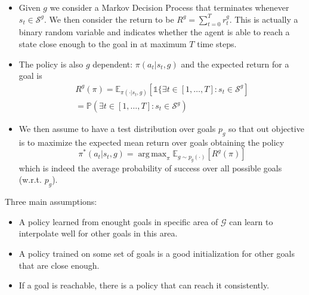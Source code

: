 \documentclass{beamer}
\theoremstyle{plain}
\theoremstyle{definition}
\theoremstyle{remark}
\newcommand{\Pro}{\mathds{P}}
\newcommand{\E}{\mathds{E}}
\DeclareMathOperator*{\argmax}{arg\,max}
\begin{document}
\begin{frame}
	\begin{itemize}
		\item Given $g$ we consider a Markov Decision Process that terminates whenever $s_t\in \mathcal{S}^g$. We then consider the return to be $R^g = \sum_{t=0}^{T}{r_t^g}$. This is actually a binary random variable and indicates whether the agent is able to reach a state close enough to the goal in at maximum $T$ time steps.
		\item The policy is also $g$ dependent: $\pi(a_t|s_t,g)$ and the expected return for a goal is
			\begin{align*}
				R^g(\pi) = \E_{\pi(\cdot|s_t,g)}\left[\mathds{1}\{\exists t\in[1,\ldots, T]: s_t\in\mathcal{S}^g\right]\\
				= \Pro\left(\exists t\in[1,\ldots, T]: s_t\in\mathcal{S}^g\right)
			\end{align*}
		\item We then assume to have a test distribution over goals $p_g$ so that out objective is to maximize the expected mean return over goals obtaining the policy
			\begin{equation*}
				\pi^{*}(a_t|s_t,g) = \argmax_{\pi}\E_{g\sim p_g(\cdot)}[R^g(\pi)]
			\end{equation*}
			which is indeed the average probability of success over all possible goals (w.r.t. $p_g$).
	\end{itemize}
\end{frame}

\begin{frame}
	Three main assumptions:
	\begin{itemize}
		\item A policy learned from enought goals in specific area of $\mathcal{G}$ can learn to interpolate well for other goals in this area.
		\item A policy trained on some set of goals is a good initialization for other goals that are close enough.
		\item If a goal is reachable, there is a policy that can reach it consistently.
	\end{itemize}
\end{frame}
\end{document}
